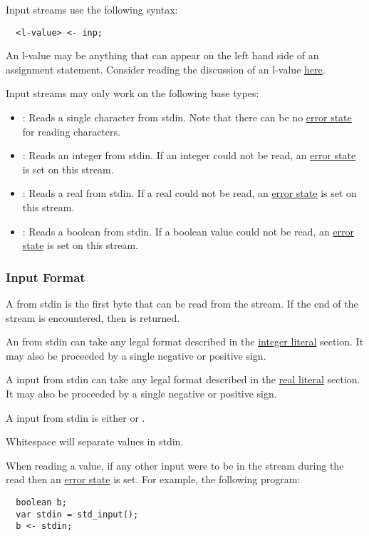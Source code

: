\documentclass[streams.tex]{subfiles}
\begin{document}
Input streams use the following syntax:
\begin{lstlisting}
  <l-value> <- inp;
\end{lstlisting}

An l-value may be anything that can appear on the left hand side of an assignment statement.
Consider reading the discussion of an l-value
\href{https://en.wikipedia.org/wiki/Value_(computer_science)\#Assignment:_l-values_and_r-values}
{here}.

Input streams may only work on the following base types:
\begin{itemize}
  \item
    : Reads a single character from stdin. Note that there can be no
    \hyperref[sssec:stream_error]{error state} for reading characters.
  \item {}:
    Reads an integer from stdin. If an integer could not be read, an \hyperref[sssec:stream_error]
    {error state} is set on this stream.
  \item {}:
    Reads a real from stdin. If a real could not be read, an \hyperref[sssec:stream_error]{error
    state} is set on this stream.
  \item {}:
    Reads a boolean from stdin. If a boolean value could not be read, an
    \hyperref[sssec:stream_error]{error state} is set on this stream.
\end{itemize}

\subsubsection{Input Format}
\label{sssec:input_format}
A  from stdin is the first byte that can be read from the stream. If the end of the
stream is encountered, then  is returned.

An  from stdin can take any legal format described in the \hyperref[sssec:int_lit]
{integer literal} section. It may also be proceeded by a single negative or positive sign.

A  input from stdin can take any legal format described in the \hyperref[sssec:real_lit]
{real literal} section. It may also be proceeded by a single negative or positive sign.

A  input from stdin is either  or .

Whitespace will separate values in stdin.

When reading a value, if any other input were to be in the stream during the read then an
\hyperref[sssec:stream_error]{error state} is set. For example, the following program:
\begin{lstlisting}
  boolean b;
  var stdin = std_input();
  b <- stdin;
\end{lstlisting}
\end{document}

